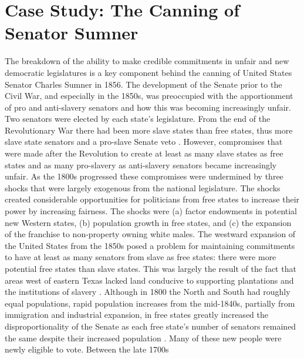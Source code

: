 \documentclass[a4paper]{article}\usepackage[]{graphicx}\usepackage[]{color}
\begin{document}
\section{Case Study: The Canning of Senator Sumner}

The breakdown of the ability to make credible commitments in unfair and new democratic legislatures is a key component behind the canning of United States Senator Charles Sumner in 1856. The development of the Senate prior to the Civil War, and especially in the 1850s, was preoccupied with the apportionment of pro and anti-slavery senators and how this was becoming increasingly unfair. Two senators were elected by each state's legislature. From the end of the Revolutionary War there had been more slave states than free states, thus more slave state senators and a pro-slave Senate veto \cite[see][151]{Weingast1998}. However, compromises that were made after the Revolution to create at least as many slave states as free states and as many pro-slavery as anti-slavery senators became increasingly unfair. As the 1800s progressed these compromises were undermined by three shocks that were largely exogenous from the national legislature. The shocks created considerable opportunities for politicians from free states to increase their power by increasing fairness. The shocks were (a) factor endowments in potential new Western states, (b) population growth in free states, and (c) the expansion of the franchise to non-property owning white males.  The westward expansion of the United States from the 1850s posed a problem for maintaining commitments to have at least as many senators from slave as free states: there were more potential free states than slave states. This was largely the result of the fact that areas west of eastern Texas lacked land conducive to supporting plantations and the institutions of slavery \cite[see][]{Ramsdell1929,Weingast1998,Sokoloff2000}. Although in 1800 the North and South had roughly equal populations, rapid population increases from the mid-1840s, partially from immigration and industrial expansion, in free states greatly increased the disproportionality of the Senate as each free state's number of senators remained the same despite their increased population \cite[see][184]{Weingast1998}. Many of these new people were newly eligible to vote. Between the late 1700s 
\end{document}
